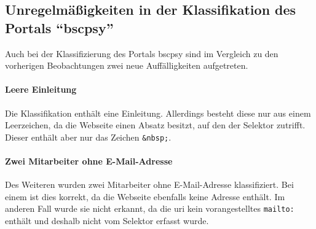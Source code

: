\subsection{Unregelmäßigkeiten in der Klassifikation des Portals "`\gls{bscpsy}"'}
    Auch bei der Klassifizierung des Portals \gls{bscpsy}
    sind im Vergleich zu den vorherigen Beobachtungen zwei neue
    Auffälligkeiten aufgetreten.

    \paragraph{Leere Einleitung}
        Die Klassifikation enthält eine Einleitung.
        Allerdings besteht diese nur aus einem Leerzeichen,
        da die Webseite einen Absatz besitzt,
        auf den der Selektor zutrifft.
        Dieser enthält aber nur das Zeichen \texttt{\&nbsp;}.

    \paragraph{Zwei Mitarbeiter ohne E-Mail-Adresse}
        Des Weiteren wurden zwei Mitarbeiter ohne E-Mail-Adresse klassifiziert.
        Bei einem ist dies korrekt, da die Webseite ebenfalls keine Adresse enthält.
        Im anderen Fall wurde sie nicht erkannt,
        da die \gls{uri} kein vorangestelltes \texttt{mailto:} enthält
        und deshalb nicht vom Selektor erfasst wurde.
        